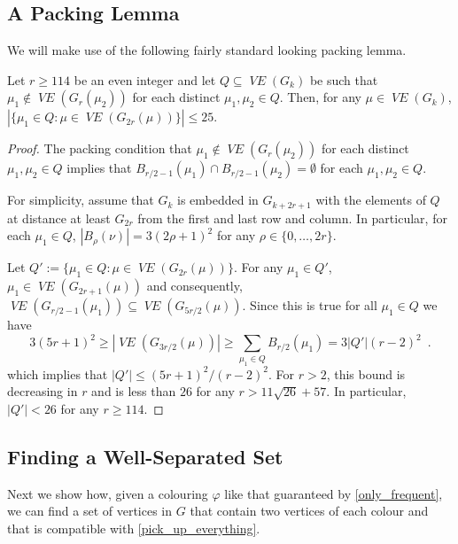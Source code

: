 \documentclass{patmorin}
\DeclareMathOperator{\VE}{\mathit{VE}}
\begin{document}
\subsection{A Packing Lemma}
\label{packing_lemma_sec}

We will make use of the following fairly standard looking packing lemma.

\begin{lem}\label{packing_lemma}
  Let $r\ge 114$ be an even integer and let $Q\subseteq \VE(G_k)$ be such that $\mu_1\not\in \VE(G_r(\mu_2))$ for each distinct $\mu_1,\mu_2\in Q$.  Then, for any $\mu\in \VE(G_k)$,
  $|\{\mu_1\in Q: \mu\in \VE(G_{2r}(\mu))\}| \le 25$.
\end{lem}

\begin{proof}
  The packing condition that $\mu_1\not\in \VE(G_r(\mu_2))$ for each distinct $\mu_1,\mu_2\in Q$ implies that $B_{r/2-1}(\mu_1)\cap B_{r/2-1}(\mu_2)=\emptyset$ for each $\mu_1,\mu_2\in Q$.
  
  For simplicity, assume that $G_k$ is embedded in $G_{k+2r+1}$ with the elements of $Q$ at distance at least $G_{2r}$ from the first and last row and column.  In particular, for each $\mu_1\in Q$, $|B_{\rho}(\nu)| = 3(2\rho+1)^2$ for any $\rho\in\{0,\ldots,2r\}$.  
  
  Let $Q':=\{\mu_1\in Q: \mu\in \VE(G_{2r}(\mu))\}$.  For any $\mu_1\in Q'$, 
  $\mu_1\in\VE(G_{2r+1}(\mu))$ and consequently, $\VE(G_{r/2-1}(\mu_1))\subseteq \VE(G_{5r/2}(\mu))$.  
  Since this is true for all $\mu_1\in Q$ we have
  \[  3(5r+1)^2 \ge |\VE(G_{3r/2}(\mu))| \ge \sum_{\mu_1\in Q} B_{r/2}(\mu_1)
  = 3|Q'|(r-2)^2 \enspace .
  \]
  which implies that $|Q'|\le (5r+1)^2/(r-2)^2$.  For $r > 2$, this bound is decreasing in $r$ and is less than $26$ for any $r> 11\sqrt{26} + 57$.  In particular, $|Q'|< 26$ for any $r\ge 114$.
\end{proof}


\subsection{Finding a Well-Separated Set}
\label{well_separated}

Next we show how, given a colouring $\varphi$ like that guaranteed by \cref{only_frequent}, we can find a set of vertices in $G$ that contain two vertices of each colour and that is compatible with \cref{pick_up_everything}.
\end{document}
